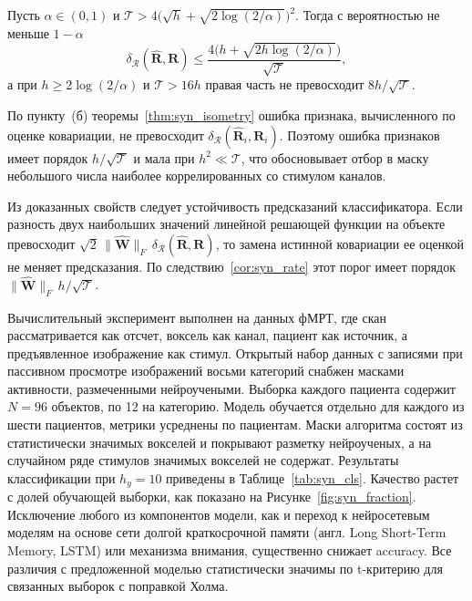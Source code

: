 \setcounter{corollary}{1}%
\begin{corollary}\label{cor:syn_rate}
Пусть $\alpha \in (0,1)$ и $\mathcal{T} > 4\big(\sqrt{h} + \sqrt{2\log(2/\alpha)}\big)^2$. Тогда с вероятностью не меньше $1-\alpha$
\begin{equation*}
\delta_{\mathcal{R}}(\hat{\mathbf{R}}, \mathbf{R}) \leqslant \frac{4\big(h + \sqrt{2h\log(2/\alpha)}\big)}{\sqrt{\mathcal{T}}},
\end{equation*}
а при $h \geqslant 2\log(2/\alpha)$ и $\mathcal{T} > 16h$ правая часть не превосходит $8h/\sqrt{\mathcal{T}}$.
\end{corollary}
По пункту~(б) теоремы~\ref{thm:syn_isometry} ошибка признака, вычисленного по оценке ковариации, не превосходит $\delta_{\mathcal{R}}(\hat{\mathbf{R}}_i, \mathbf{R}_i)$. Поэтому ошибка признаков имеет порядок $h/\sqrt{\mathcal{T}}$ и мала при $h^2 \ll \mathcal{T}$, что обосновывает отбор в маску небольшого числа наиболее коррелированных со стимулом каналов.

Из доказанных свойств следует устойчивость предсказаний классификатора. Если разность двух наибольших значений линейной решающей функции на объекте превосходит $\sqrt{2}\,\|\hat{\mathbf{W}}\|_F\,\delta_{\mathcal{R}}(\hat{\mathbf{R}}, \mathbf{R})$, то замена истинной ковариации ее оценкой не меняет предсказания. По следствию~\ref{cor:syn_rate} этот порог имеет порядок $\|\hat{\mathbf{W}}\|_F\,h/\sqrt{\mathcal{T}}$.

Вычислительный эксперимент выполнен на данных фМРТ, где скан рассматривается как отсчет, воксель как канал, пациент как источник, а предъявленное изображение как стимул. Открытый набор данных с записями при пассивном просмотре изображений восьми категорий снабжен масками активности, размеченными нейроучеными. Выборка каждого пациента содержит $N = 96$ объектов, по 12 на категорию. Модель обучается отдельно для каждого из шести пациентов, метрики усреднены по пациентам. Маски алгоритма состоят из статистически значимых вокселей и покрывают разметку нейроученых, а на случайном ряде стимулов значимых вокселей не содержат. Результаты классификации при $h_y = 10$ приведены в Таблице~\ref{tab:syn_cls}. Качество растет с долей обучающей выборки, как показано на Рисунке~\ref{fig:syn_fraction}. Исключение любого из компонентов модели, как и переход к нейросетевым моделям на основе сети долгой краткосрочной памяти (англ. Long Short-Term Memory, LSTM) или механизма внимания, существенно снижает accuracy. Все различия с предложенной моделью статистически значимы по t-критерию для связанных выборок с поправкой Холма.

